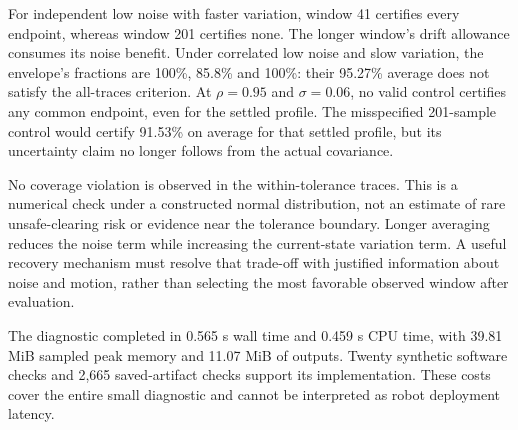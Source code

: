 For independent low noise with faster variation, window 41 certifies every endpoint, whereas window 201 certifies none. The longer window's drift allowance consumes its noise benefit. Under correlated low noise and slow variation, the envelope's fractions are 100\%, 85.8\% and 100\%: their 95.27\% average does not satisfy the all-traces criterion. At $\rho=0.95$ and $\sigma=0.06$, no valid control certifies any common endpoint, even for the settled profile. The misspecified 201-sample control would certify 91.53\% on average for that settled profile, but its uncertainty claim no longer follows from the actual covariance.

No coverage violation is observed in the within-tolerance traces. This is a numerical check under a constructed normal distribution, not an estimate of rare unsafe-clearing risk or evidence near the tolerance boundary. Longer averaging reduces the noise term while increasing the current-state variation term. A useful recovery mechanism must resolve that trade-off with justified information about noise and motion, rather than selecting the most favorable observed window after evaluation.

The diagnostic completed in 0.565 s wall time and 0.459 s CPU time, with 39.81 MiB sampled peak memory and 11.07 MiB of outputs. Twenty synthetic software checks and 2,665 saved-artifact checks support its implementation. These costs cover the entire small diagnostic and cannot be interpreted as robot deployment latency.

